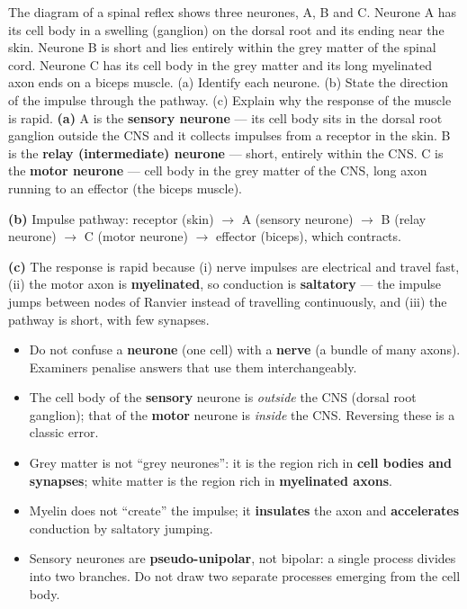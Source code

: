 \documentclass[11pt]{article}
\begin{document}
\begin{exoresolu}
The diagram of a spinal reflex shows three neurones, A, B and C. Neurone A has its cell body in a swelling (ganglion) on the dorsal root and its ending near the skin. Neurone B is short and lies entirely within the grey matter of the spinal cord. Neurone C has its cell body in the grey matter and its long myelinated axon ends on a biceps muscle. (a) Identify each neurone. (b) State the direction of the impulse through the pathway. (c) Explain why the response of the muscle is rapid.
\tcblower
\textbf{(a)} A is the \textbf{sensory neurone} — its cell body sits in the dorsal root ganglion outside the CNS and it collects impulses from a receptor in the skin. B is the \textbf{relay (intermediate) neurone} — short, entirely within the CNS. C is the \textbf{motor neurone} — cell body in the grey matter of the CNS, long axon running to an effector (the biceps muscle).

\textbf{(b)} Impulse pathway: receptor (skin) $\rightarrow$ A (sensory neurone) $\rightarrow$ B (relay neurone) $\rightarrow$ C (motor neurone) $\rightarrow$ effector (biceps), which contracts.

\textbf{(c)} The response is rapid because (i) nerve impulses are electrical and travel fast, (ii) the motor axon is \textbf{myelinated}, so conduction is \textbf{saltatory} — the impulse jumps between nodes of Ranvier instead of travelling continuously, and (iii) the pathway is short, with few synapses.
\end{exoresolu}

\begin{attention}
\begin{itemize}
\item Do not confuse a \textbf{neurone} (one cell) with a \textbf{nerve} (a bundle of many axons). Examiners penalise answers that use them interchangeably.
\item The cell body of the \textbf{sensory} neurone is \emph{outside} the CNS (dorsal root ganglion); that of the \textbf{motor} neurone is \emph{inside} the CNS. Reversing these is a classic error.
\item Grey matter is not ``grey neurones'': it is the region rich in \textbf{cell bodies and synapses}; white matter is the region rich in \textbf{myelinated axons}.
\item Myelin does not ``create'' the impulse; it \textbf{insulates} the axon and \textbf{accelerates} conduction by saltatory jumping.
\item Sensory neurones are \textbf{pseudo-unipolar}, not bipolar: a single process divides into two branches. Do not draw two separate processes emerging from the cell body.
\end{itemize}
\end{attention}
\end{document}
